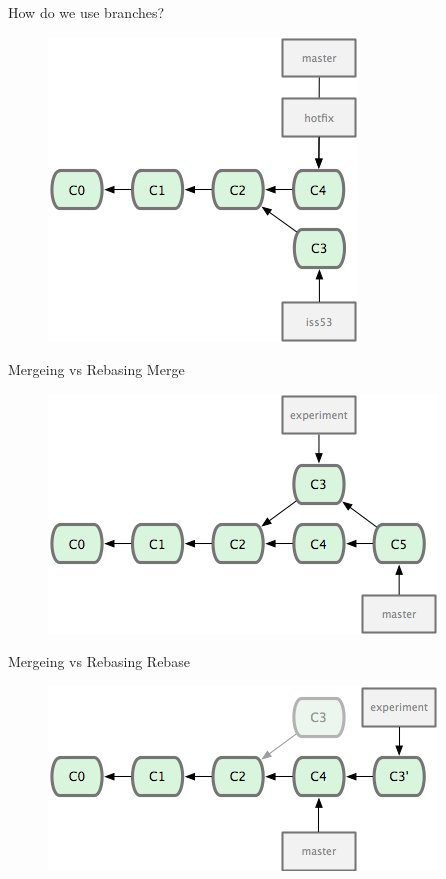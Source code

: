\documentclass[14pt]{beamer}
\begin{document}
\begin{frame}{How do we use branches?}
	\begin{figure}[htb]
		\centering
		\includegraphics[width=.7\textwidth]{hotfix2.png}
	\end{figure}
\end{frame}

\begin{frame}{Mergeing vs Rebasing}
	Merge
	\begin{figure}[htb]
		\centering
		\includegraphics[width=.7\textwidth]{merge.png}
	\end{figure}
\end{frame}

\begin{frame}{Mergeing vs Rebasing}
        Rebase
	\begin{figure}[htb]
		\centering
		\includegraphics[width=.7\textwidth]{rebase.png}
	\end{figure}
\end{frame}
\end{document}
